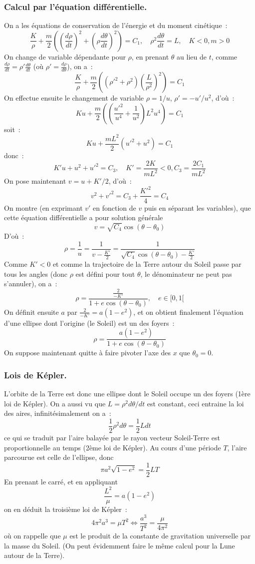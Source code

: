 \documentclass[a4paper,11pt]{article}
\begin{document}
\subsubsection{Calcul par l'\'equation diff\'erentielle.}
On a les équations de conservation de l'\'energie et du moment cin\'etique~:
\[ \frac{K}{\rho}+\frac{m}{2} \left( \left(\frac{d\rho}{dt}\right)^2
+ \left(\rho \frac{d\theta}{dt} \right)^2 \right)
=C_1, \quad \rho^2 \frac{d\theta}{dt} = L, \quad K<0, m>0
\]
On change de variable dépendante pour $\rho$, 
en prenant $\theta$ au lieu de $t$,
comme $\frac{d\rho}{dt}=\rho' \frac{d\theta}{dt}$ 
(où $\rho'=\frac{d\rho}{d\theta}$), on a~:
\[
 \frac{K}{\rho}+\frac{m}{2}\left( (\rho'^2+\rho^2) 
\left(\frac{L}{\rho^2}\right)^2 \right) = C_1
\]
On effectue ensuite le changement de variable $\rho=1/u$, $\rho'=-u'/ u^2$,
d'où~:
\[
K u + \frac{m}{2} \left( 
\left(\frac{u'^2 }{u^4}+\frac{1}{u^2}\right) L^2 u^4 \right)
= C_1
\]
soit~:
\[ K u + \frac{mL^2}{2} ( u'^2+u^2) = C_1 \]
donc~:
\[ K' u + u^2 + u'^2 = C_3, \quad 
K'=\frac{2K}{mL^2} <0, C_3=\frac{2C_1}{mL^2}
\]
On pose maintenant $v=u+K'/2$, d'où~:
\[ v^2 + v'^2 = C_3 + \frac{K'^2}{4} = C_4 \]
On montre (en exprimant $v'$ en fonction de $v$ puis en séparant les
variables), que cette équation différentielle a pour solution générale
\[ v= \sqrt{C_4} \cos(\theta-\theta_0) \]
D'où~:
\[ \rho = \frac{1}{u} =
\frac{1}{v-\frac{K'}{2}} = 
\frac{1}{\sqrt{C_4} \cos(\theta-\theta_0)-\frac{K'}{2}}
\]
Comme $K'<0$ et comme la trajectoire de la Terre autour du Soleil
passe par tous les angles (donc $\rho$ est défini pour tout $\theta$,
le dénominateur ne peut pas s'annuler), on a~:
\[ \rho = \frac{\frac{2}{-K'}}{1+e \cos(\theta-\theta_0)}, \quad e \in [0,1[ \]
On définit ensuite $a$ par $\frac{2}{-K'}=a(1-e^2)$, et on obtient finalement
l'équation d'une ellipse dont l'origine (le Soleil) est un des
foyers~:
\[  \rho = \frac{a(1-e^2)}{1+e \cos(\theta-\theta_0)} \]
On suppose maintenant quitte à faire pivoter l'axe des $x$ que
$\theta_0=0$.

\subsubsection{Lois de K\'epler.}
L'orbite de la Terre est donc une ellipse dont le Soleil occupe un des foyers
(1\`ere loi de K\'epler).
On a aussi vu que $L=\rho^2 d\theta/dt$ est constant, ceci entraine la loi
des aires, infinit\'esimalement on a~:
\[ \frac{1}{2}\rho^2 d\theta = \frac{1}{2} L dt \]
ce qui se traduit par
l'aire balay\'ee par le rayon vecteur Soleil-Terre est proportionnelle
au temps (2\`eme loi de K\'epler). 
Au cours d'une p\'eriode $T$, l'aire parcourue est celle
de l'ellipse, donc 
\[ \pi a^2 \sqrt{1-e^2}=\frac{1}{2}LT \]
En prenant le carr\'e, et en appliquant
\[ \frac{L^2}{\mu}= a(1-e^2)\]
on en d\'eduit la troisi\`eme loi de K\'epler~:
\[ 4\pi^2 a^3 = \mu T^2 \Leftrightarrow \frac{a^3}{T^2} = \frac{\mu}{4\pi^2} \]
o\`u on rappelle que $\mu$ est le produit de la constante de gravitation
universelle par la masse du Soleil. (On peut \'evidemment faire
le m\^eme calcul pour la Lune autour de la Terre).
\end{document}
